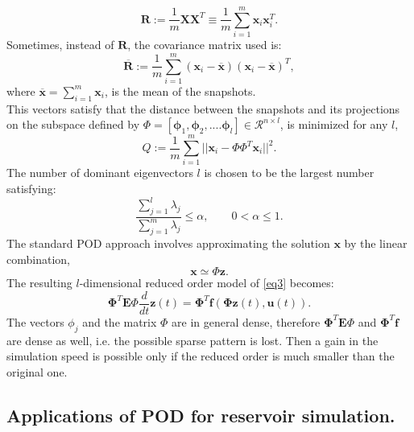 \documentclass[12pt]{report}
\begin{document}
\begin{equation}
\mathbf{R}:= \frac{1}{m}\mathbf{X}\mathbf{X}^T \equiv \frac{1}{m} \sum_{i=1}^m \mathbf{x}_i \mathbf{x}_i^T.
\end{equation}
Sometimes, instead of $\mathbf{R}$, the covariance matrix used is:
\begin{equation}
\overline{\mathbf{R}}:=\frac{1}{m} \sum_{i=1}^m (\mathbf{x}_i-\overline{\mathbf{x}}) (\mathbf{x}_i-\overline{\mathbf{x}})^T,
\end{equation}
where $\overline{\mathbf{x}}=\sum_{i=1}^m \mathbf{x}_i$, is the mean of the snapshots.\\
This vectors satisfy that the distance between the snapshots
and its projections on the subspace defined by 
$\Phi=[\mathbf{\phi}_1 , \mathbf{\phi}_2,.... \mathbf{\phi}_l] \in \mathcal{R}^{n \times l}$, 
is minimized for any $l$,
\begin{equation}
Q:=\frac{1}{m} \sum_{i=1}^m ||\mathbf{x}_i- \Phi \Phi ^T \mathbf{x}_i ||^2.
\end{equation}
The number of dominant eigenvectors $l$ is chosen to be the largest number satisfying:
\begin{equation}
\frac{\sum_{j=1}^l\lambda_j}{\sum_{j=1}^m\lambda_j}\leq \alpha, \qquad 0<\alpha \leq 1.
\end{equation}
The standard POD approach involves approximating the solution $ \mathbf{x}$ by the linear combination,
\begin{equation}
\mathbf{x}\simeq \Phi \mathbf{z}.
\end{equation}
The resulting $l$-dimensional reduced order model of \eqref{eq3} becomes: 
\begin{equation} \label{rod}
\mathbf{\Phi}^T \mathbf{E}\Phi \frac{d}{dt} \mathbf{z}(t)=\mathbf{\Phi}^T \mathbf{f}(\mathbf{\Phi} \mathbf{z}(t),\mathbf{u}(t)).
\end{equation} 
The vectors $\phi_j$ and the matrix $\Phi$ are in general dense, 
therefore $\mathbf{\Phi}^T \mathbf{E}\Phi$ and $\mathbf{\Phi}^T \mathbf{f}$ are dense as well, i.e. the possible sparse pattern is lost. 
Then a gain in the simulation speed is possible only if the reduced order is much smaller than the original one.\\

\subsection*{Applications of POD for reservoir simulation.}
\end{document}
